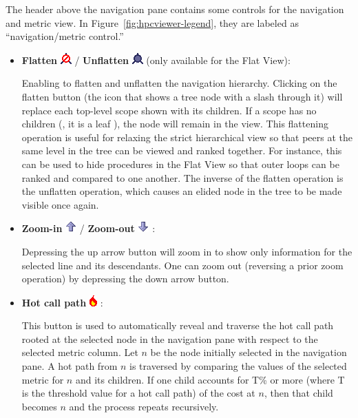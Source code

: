The header above the navigation pane contains some controls for the navigation and metric view.
In Figure~\ref{fig:hpcviewer-legend}, they are labeled as ``navigation/metric control.''
\begin{itemize}

\item \textbf{Flatten} \includegraphics[scale=.8]{fig/hpcviewer-button-flatten.png} /
      \textbf{Unflatten} \includegraphics[scale=.8]{fig/hpcviewer-button-unflatten.png}
      (only available for the Flat View):

Enabling to flatten and unflatten the navigation hierarchy.
Clicking on the flatten button (the icon that shows a tree node with a slash through it) will replace each top-level scope shown with its children.
If a scope has no children (\ie{}, it is a leaf ), the node will remain in the view.
This flattening operation is useful for relaxing the strict hierarchical view so that peers at the same level in the tree can be viewed and ranked together.
For instance, this can be used to hide procedures in the Flat View so that outer loops can be ranked and compared to one another.
The inverse of the flatten operation is the unflatten operation, which causes an elided node in the tree to be made visible once again.

\item \textbf{Zoom-in} \includegraphics[scale=.8]{fig/hpcviewer-button-zoomin.png} /
      \textbf{Zoom-out} \includegraphics[scale=.8]{fig/hpcviewer-button-zoomout.png} :

Depressing the up arrow button will zoom in to show only information for the selected line and its descendants.
One can zoom out (reversing a prior zoom operation) by depressing the down arrow button.

\item \textbf{Hot call path} \includegraphics[scale=.8]{fig/hpcviewer-button-hotpath.png} :

This button is used to automatically reveal and traverse the hot call path rooted at the selected node in the navigation pane with respect to the selected metric column. Let $n$ be the node initially selected in the navigation pane.
A hot path from $n$  is traversed by comparing the values of the selected metric for $n$ and its children. If one child accounts for T\% or more (where T is the threshold value for a hot call path) of the cost at $n$,  then that child becomes $n$ and the process repeats recursively.



\end{itemize}
